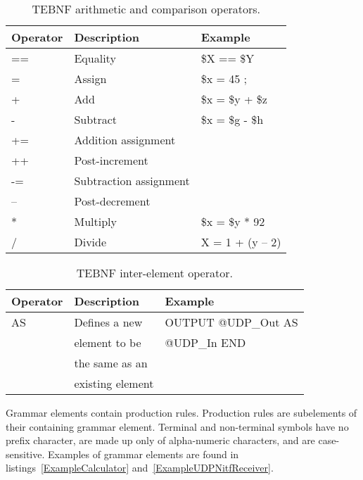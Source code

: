 \begin{table}[h!]
\begin{center}
\caption{TEBNF arithmetic and comparison operators.}
\label{TEBNFArithmeticAndComparisonOperators}
\begin{tabular}{|l|l|l|} \hline
\textbf{Operator} & \textbf{Description} & \textbf{Example} \\ \hline \hline
== & Equality & \$X == \$Y \\ \hline
=  & Assign   & \$x = 45 ; \\ \hline
+  & Add      & \$x = \$y + \$z \\ \hline
-  & Subtract & \$x = \$g - \$h \\ \hline
+= & Addition assignment & 	 \\ \hline
++ & Post-increment &  \\ \hline
-= & Subtraction assignment &  \\ \hline
-- & Post-decrement &  \\ \hline
*  & Multiply & \$x = \$y * 92 \\ \hline
/  & Divide & X = 1 + (y – 2) \\ \hline
\end{tabular}
\end{center}
\end{table}

\begin{table}[h!]
\begin{center}
\caption{TEBNF inter-element operator.}
\label{TEBNFInterElementOperator}
\begin{tabular}{|l|l|l|} \hline
\textbf{Operator} & \textbf{Description} & \textbf{Example} \\ \hline \hline
AS & Defines a new    & OUTPUT @UDP\_Out AS \\
   & element to be    & @UDP\_In END        \\                  
   & the same as an   &                     \\
   & existing element &                     \\ \hline
\end{tabular}
\end{center}
\end{table}

\label{sec:TEBNFGrammarElements}
Grammar elements contain production rules.  Production rules are subelements of their containing grammar element.  Terminal and non-terminal symbols have no prefix character, are made up only of alpha-numeric characters, and are case-sensitive.  Examples of grammar elements are found in listings~\ref{ExampleCalculator} and~\ref{ExampleUDPNitfReceiver}.


